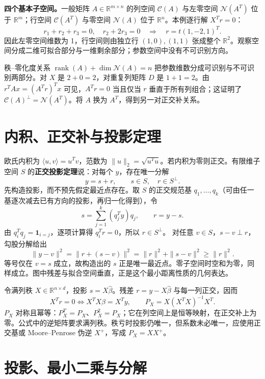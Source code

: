 \textbf{四个基本子空间。}一般矩阵 $A\in\mathbb R^{m\times n}$ 的列空间 $\mathcal C(A)$ 与左零空间 $\mathcal N(A^T)$ 位于 $\mathbb R^m$；行空间 $\mathcal C(A^T)$ 与零空间 $\mathcal N(A)$ 位于 $\mathbb R^n$。本例逐行解 $X^Tr=0$：
\[
 r_1+r_2+r_3=0,\quad r_2+2r_3=0
 \quad\Longrightarrow\quad r=t(1,-2,1)^T.
\]
因此左零空间维数为 1，行空间则由独立行 $(1,0),(1,1)$ 张成整个 $\mathbb R^2$。观察空间分成二维可拟合部分与一维剩余部分；参数空间中没有不可识别方向。

秩--零化度关系 $\operatorname{rank}(A)+\dim\mathcal N(A)=n$ 把参数维数分成可识别与不可识别两部分。对 $X$ 是 $2+0=2$，对重复列矩阵 $D$ 是 $1+1=2$。由 $r^TAx=(A^Tr)^Tx$ 可见，$A^Tr=0$ 当且仅当 $r$ 垂直于所有列组合；这证明了 $\mathcal C(A)^\perp=\mathcal N(A^T)$。将 $A$ 换为 $A^T$，得到另一对正交补关系。

\section{内积、正交补与投影定理}

欧氏内积为 $\langle u,v\rangle=u^Tv$，范数为 $\lVert u\rVert_2=\sqrt{u^Tu}$。若内积为零则正交。有限维子空间 $S$ 的\textbf{正交投影定理}说：对每个 $y$，存在唯一分解
\[
  y=s+r,\qquad s\in S,\quad r\in S^\perp.
\]
先构造投影，而不预先假定最近点存在。取 $S$ 的正交规范基 $q_1,\ldots,q_k$（可由任一基逐次减去已有方向的投影，再归一化得到），令
\[
s=\sum_{j=1}^k(q_j^Ty)q_j,\qquad r=y-s.
\]
由 $q_i^Tq_j=\mathbf1_{i=j}$，逐项计算得 $q_i^Tr=0$，所以 $r\in S^\perp$。
对任意 $v\in S$，$s-v\perp r$，勾股分解给出
\[
\|y-v\|^2=\|r+(s-v)\|^2=\|r\|^2+\|s-v\|^2\ge\|r\|^2.
\]
等号仅在 $v=s$ 成立，故构造出的 $s$ 正是唯一最近点。零子空间时空和为零，同样成立。图中残差与拟合空间垂直，正是这个最小距离性质的几何表达。



令满列秩 $X\in\mathbb R^{n\times d}$，投影 $s=X\hat\beta$。残差 $r=y-X\hat\beta$ 与每一列正交，因而
\[
  X^Tr=0
  \Longleftrightarrow X^TX\hat\beta=X^Ty,
  \qquad
  P_X=X(X^TX)^{-1}X^T.
\]
$P_X$ 对称且幂等：$P_X^T=P_X$、$P_X^2=P_X$；它在列空间上是恒等映射，在正交补上为零。公式中的逆矩阵要求满列秩。秩亏时投影仍唯一，但系数未必唯一，应使用正交基或 Moore--Penrose 伪逆 $X^+$，写成 $P_X=XX^+$。


\section{投影、最小二乘与分解}

